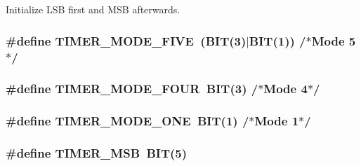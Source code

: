 Initialize L\+SB first and M\+SB afterwards. 

\subsubsection[{\texorpdfstring{T\+I\+M\+E\+R\+\_\+\+M\+O\+D\+E\+\_\+\+F\+I\+VE}{TIMER_MODE_FIVE}}]{\setlength{\rightskip}{0pt plus 5cm}\#define T\+I\+M\+E\+R\+\_\+\+M\+O\+D\+E\+\_\+\+F\+I\+VE~({\bf B\+IT}(3)$\vert${\bf B\+IT}(1)) /$\ast$Mode 5$\ast$/}\hypertarget{group__i8254_ga3a806d58a6b0423e5777dd471833e04d}{}\label{group__i8254_ga3a806d58a6b0423e5777dd471833e04d}
\subsubsection[{\texorpdfstring{T\+I\+M\+E\+R\+\_\+\+M\+O\+D\+E\+\_\+\+F\+O\+UR}{TIMER_MODE_FOUR}}]{\setlength{\rightskip}{0pt plus 5cm}\#define T\+I\+M\+E\+R\+\_\+\+M\+O\+D\+E\+\_\+\+F\+O\+UR~{\bf B\+IT}(3) /$\ast$Mode 4$\ast$/}\hypertarget{group__i8254_gad8bbac3f9bcc1835c3f65921bbe768dc}{}\label{group__i8254_gad8bbac3f9bcc1835c3f65921bbe768dc}
\subsubsection[{\texorpdfstring{T\+I\+M\+E\+R\+\_\+\+M\+O\+D\+E\+\_\+\+O\+NE}{TIMER_MODE_ONE}}]{\setlength{\rightskip}{0pt plus 5cm}\#define T\+I\+M\+E\+R\+\_\+\+M\+O\+D\+E\+\_\+\+O\+NE~{\bf B\+IT}(1) /$\ast$Mode 1$\ast$/}\hypertarget{group__i8254_ga892f1f8bb1173306481a9c1ce5cfcd10}{}\label{group__i8254_ga892f1f8bb1173306481a9c1ce5cfcd10}
\subsubsection[{\texorpdfstring{T\+I\+M\+E\+R\+\_\+\+M\+SB}{TIMER_MSB}}]{\setlength{\rightskip}{0pt plus 5cm}\#define T\+I\+M\+E\+R\+\_\+\+M\+SB~{\bf B\+IT}(5)}\hypertarget{group__i8254_ga2a8a6d363c612d756cd8d78480f7cd04}{}\label{group__i8254_ga2a8a6d363c612d756cd8d78480f7cd04}


